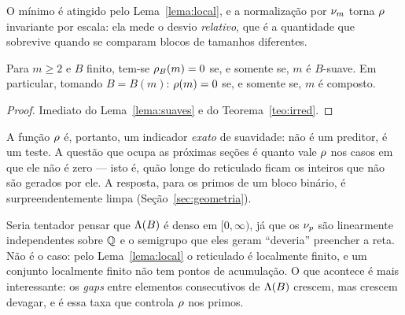 O mínimo é atingido pelo Lema~\ref{lema:local}, e a normalização por $\nu_{m}$
torna $\rho$ invariante por escala: ela mede o desvio \emph{relativo}, que é a
quantidade que sobrevive quando se comparam blocos de tamanhos diferentes.

\begin{corolario}\label{cor:zero}
Para $m\ge2$ e $B$ finito, tem-se $\rho_B(m)=0$ se, e somente se, $m$ é
$B$-suave. Em particular, tomando $B=B(m)$: $\rho(m)=0$ se, e somente se, $m$ é
composto.
\end{corolario}

\begin{proof}
Imediato do Lema~\ref{lema:suaves} e do Teorema~\ref{teo:irred}.
\end{proof}

A função $\rho$ é, portanto, um indicador \emph{exato} de suavidade: não é um
preditor, é um teste. A questão que ocupa as próximas seções é quanto vale
$\rho$ nos casos em que ele não é zero — isto é, quão longe do reticulado ficam os
inteiros que não são gerados por ele. A resposta, para os primos de um bloco
binário, é surpreendentemente limpa (Seção~\ref{sec:geometria}).

\begin{observacao}\label{obs:denso}
Seria tentador pensar que $\Lambda(B)$ é denso em $[0,\infty)$, já que os $\nu_{p}$
são linearmente independentes sobre $\mathbb{Q}$ e o semigrupo que eles geram ``deveria''
preencher a reta. Não é o caso: pelo Lema~\ref{lema:local} o reticulado é
localmente finito, e um conjunto localmente finito não tem pontos de acumulação.
O que acontece é mais interessante: os \emph{gaps} entre elementos consecutivos de
$\Lambda(B)$ crescem, mas crescem devagar, e é essa taxa que controla $\rho$ nos
primos.
\end{observacao}
